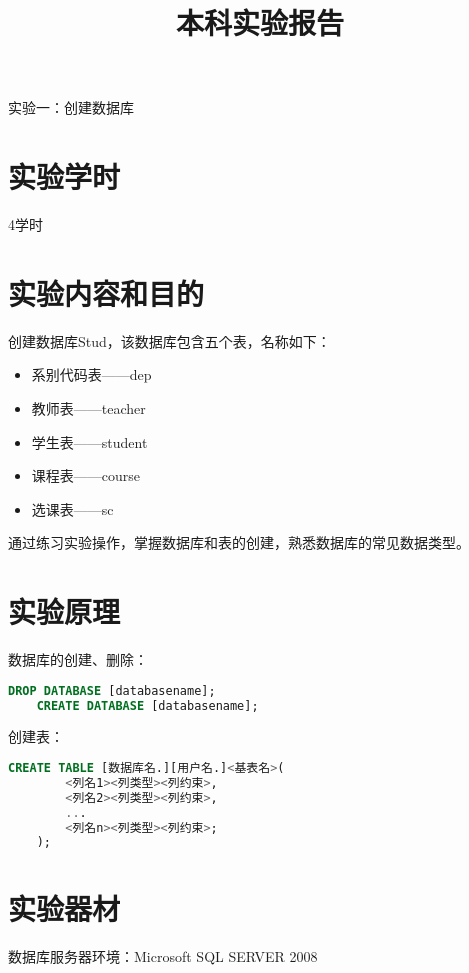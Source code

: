 \documentclass[a4paper]{uestcreport}
\title{本科实验报告}
\date{\zhtoday}
\begin{document}
\thispagestyle{empty}
\makecover

\setcounter{page}{1} %

\begin{center}
    \Large
    实验一：创建数据库
\end{center}
\thispagestyle{fancy}
\section{实验学时}
4学时

\section{实验内容和目的}
创建数据库Stud，该数据库包含五个表，名称如下：
\begin{itemize}
    \item 系别代码表——dep
    \item 教师表——teacher
    \item 学生表——student
    \item 课程表——course
    \item 选课表——sc
\end{itemize}

通过练习实验操作，掌握数据库和表的创建，熟悉数据库的常见数据类型。

\section{实验原理}
数据库的创建、删除：
\begin{lstlisting}[language=SQL]
    DROP DATABASE [databasename];
    CREATE DATABASE [databasename];
\end{lstlisting}

创建表：
\begin{lstlisting}[language=SQL]
    CREATE TABLE [数据库名.][用户名.]<基表名>(
        <列名1><列类型><列约束>,
        <列名2><列类型><列约束>,
        ...
        <列名n><列类型><列约束>;
    );
\end{lstlisting}

\section{实验器材}
数据库服务器环境：Microsoft SQL SERVER 2008
\end{document}
